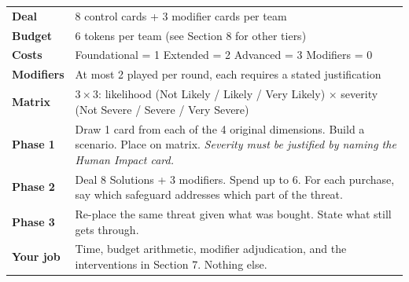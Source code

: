\documentclass[11pt,letterpaper]{article}
\begin{document}
\begin{center}
\small
\begin{tabularx}{\textwidth}{@{}l X@{}}
\toprule
\textbf{Deal} & 8 control cards + 3 modifier cards per team \\
\textbf{Budget} & 6 tokens per team (see Section 8 for other tiers) \\
\textbf{Costs} & Foundational = 1 \quad Extended = 2 \quad Advanced = 3 \quad Modifiers = 0 \\
\textbf{Modifiers} & At most 2 played per round, each requires a stated justification \\
\textbf{Matrix} & $3\times3$: likelihood (Not Likely / Likely / Very Likely) $\times$ severity (Not Severe / Severe / Very Severe) \\
\midrule
\textbf{Phase 1} & Draw 1 card from each of the 4 original dimensions. Build a scenario. Place on matrix. \emph{Severity must be justified by naming the Human Impact card.} \\
\textbf{Phase 2} & Deal 8 Solutions + 3 modifiers. Spend up to 6. For each purchase, say which safeguard addresses which part of the threat. \\
\textbf{Phase 3} & Re-place the same threat given what was bought. State what still gets through. \\
\midrule
\textbf{Your job} & Time, budget arithmetic, modifier adjudication, and the interventions in Section 7. Nothing else. \\
\bottomrule
\end{tabularx}
\end{center}
\end{document}
